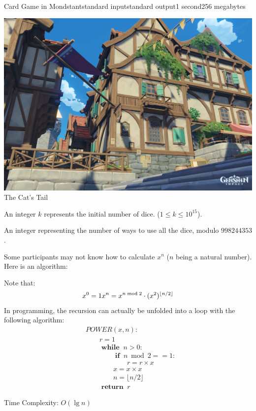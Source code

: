 \begin{problem}{Card Game in Mondstant}{standard input}{standard output}{1 second}{256 megabytes}
\begin{center}
  \includegraphics[scale=0.15]{cattail.jpg} \\
  \small{The Cat's Tail}
\end{center}


\InputFile
An integer $k$ represents the initial number of dice. ($1 \le k \le 10^{15}$).

\OutputFile
An integer representing the number of ways to use all the dice, modulo $998244353$.

\Examples

\begin{example}
%
%
%
\end{example}

\Note
Some participants may not know how to calculate $x^n$ ($n$ being a natural number). Here is an algorithm:

Note that:
$$
x^0 = 1\\
x^n = x^{n \bmod 2} \cdot (x^2)^{\lfloor n / 2 \rfloor}
$$
In programming, the recursion can actually be unfolded into a loop with the following algorithm:
$$
\begin{aligned}
& POWER(x, n):\\
& \hspace{2em}   r = 1\\
& \hspace{2em}   \boldsymbol{\operatorname{while }}\; n > 0:\\
& \hspace{4em}       \boldsymbol{\operatorname{if }}\; n \bmod 2 == 1:\\
& \hspace{6em}           r = r \times x\\
& \hspace{4em}       x = x \times x\\
& \hspace{4em}       n = \lfloor n / 2 \rfloor\\
& \hspace{2em}   \boldsymbol{\operatorname{return }}\; r
\end{aligned}
$$


Time Complexity: $O(\lg n)$

\end{problem}

